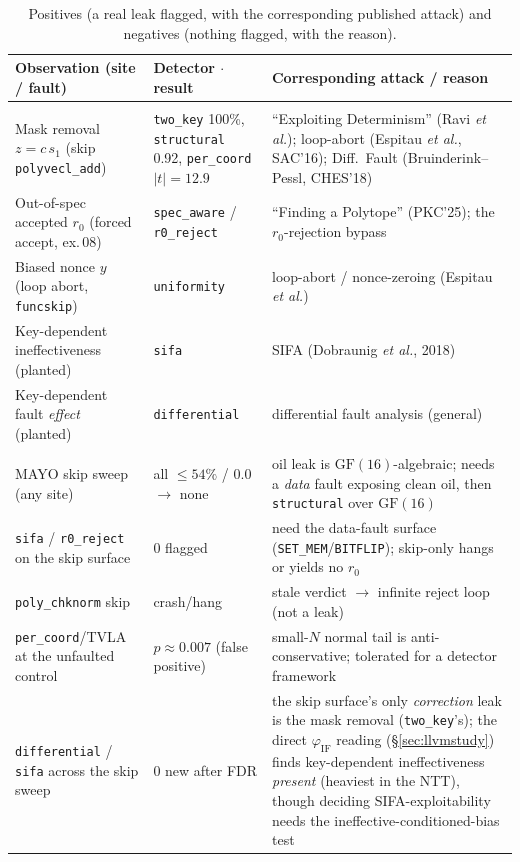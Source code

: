 \documentclass[11pt]{article}
\newcommand{\code}[1]{\texttt{#1}}
\newcommand{\GF}[1]{\ensuremath{\mathrm{GF}(#1)}}
\begin{document}
\begin{table}[h]
\centering\footnotesize
\caption{Positives (a real leak flagged, with the corresponding published attack) and
negatives (nothing flagged, with the reason).}
\label{tab:posneg}
\begin{tabular}{@{}>{\raggedright\arraybackslash}p{3.5cm}>{\raggedright\arraybackslash}p{3.1cm}>{\raggedright\arraybackslash}p{5.1cm}@{}}
\toprule
Observation (site / fault) & Detector $\cdot$ result & Corresponding attack / reason \\
\midrule
\multicolumn{3}{@{}l}{\textbf{Positives --- a real leak, flagged}}\\
\addlinespace[2pt]
Mask removal $z=c\,s_1$ (skip \code{polyvecl\_add}) & \code{two\_key} 100\%, \code{structural} 0.92, \code{per\_coord} $|t|{=}12.9$ & ``Exploiting Determinism'' (Ravi \emph{et al.}); loop-abort (Espitau \emph{et al.}, SAC'16); Diff.\ Fault (Bruinderink--Pessl, CHES'18) \\
Out-of-spec accepted $r_0$ (forced accept, ex.\,08) & \code{spec\_aware} / \code{r0\_reject} & ``Finding a Polytope'' (PKC'25); the $r_0$-rejection bypass \\
Biased nonce $y$ (loop abort, \code{funcskip}) & \code{uniformity} & loop-abort / nonce-zeroing (Espitau \emph{et al.}) \\
Key-dependent ineffectiveness (planted) & \code{sifa} & SIFA (Dobraunig \emph{et al.}, 2018) \\
Key-dependent fault \emph{effect} (planted) & \code{differential} & differential fault analysis (general) \\
\midrule
\multicolumn{3}{@{}l}{\textbf{Negatives --- nothing flagged (honest), and why}}\\
\addlinespace[2pt]
MAYO skip sweep (any site) & all $\leq 54\%$ / $0.0$ $\to$ none & oil leak is \GF{16}-algebraic; needs a \emph{data} fault exposing clean oil, then \code{structural} over \GF{16} \\
\code{sifa} / \code{r0\_reject} on the skip surface & $0$ flagged & need the data-fault surface (\code{SET\_MEM}/\code{BITFLIP}); skip-only hangs or yields no $r_0$ \\
\code{poly\_chknorm} skip & crash/hang & stale verdict $\to$ infinite reject loop (not a leak) \\
\code{per\_coord}/TVLA at the unfaulted control & $p\approx0.007$ (false positive) & small-$N$ normal tail is anti-conservative; tolerated for a detector framework \\
\code{differential} / \code{sifa} across the skip sweep & $0$ new after FDR & the skip surface's only \emph{correction} leak is the mask removal (\code{two\_key}'s); the direct $\varphi_{\mathrm{IF}}$ reading (\S\ref{sec:llvmstudy}) finds key-dependent ineffectiveness \emph{present} (heaviest in the NTT), though deciding SIFA-exploitability needs the ineffective-conditioned-bias test \\
\bottomrule
\end{tabular}
\end{table}
\end{document}
